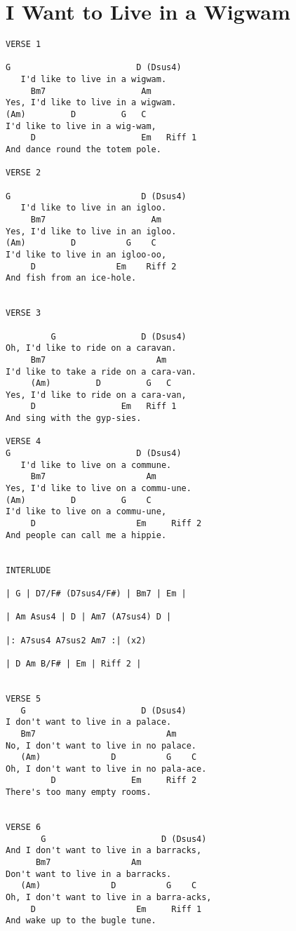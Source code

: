 \documentclass[leqno]{memoir}
\begin{document}
\chapter{I Want to Live in a Wigwam}
\begin{verbatim}
VERSE 1

G                         D (Dsus4)
   I'd like to live in a wigwam. 
     Bm7                   Am
Yes, I'd like to live in a wigwam.
(Am)         D         G   C
I'd like to live in a wig-wam, 
     D                     Em   Riff 1
And dance round the totem pole. 

VERSE 2

G                          D (Dsus4)
   I'd like to live in an igloo. 
     Bm7                     Am
Yes, I'd like to live in an igloo.
(Am)         D          G    C
I'd like to live in an igloo-oo,
     D                Em    Riff 2
And fish from an ice-hole.


VERSE 3

         G                 D (Dsus4)
Oh, I'd like to ride on a caravan.
     Bm7                      Am
I'd like to take a ride on a cara-van.
     (Am)         D         G   C
Yes, I'd like to ride on a cara-van, 
     D                 Em   Riff 1
And sing with the gyp-sies.

VERSE 4
G                         D (Dsus4)
   I'd like to live on a commune.
     Bm7                    Am
Yes, I'd like to live on a commu-une.
(Am)         D         G    C
I'd like to live on a commu-une,
     D                    Em     Riff 2
And people can call me a hippie.


INTERLUDE

| G | D7/F# (D7sus4/F#) | Bm7 | Em | 

| Am Asus4 | D | Am7 (A7sus4) D | 

|: A7sus4 A7sus2 Am7 :| (x2)

| D Am B/F# | Em | Riff 2 |


VERSE 5
   G                       D (Dsus4)
I don't want to live in a palace.
   Bm7                          Am
No, I don't want to live in no palace.
   (Am)              D          G    C
Oh, I don't want to live in no pala-ace.
         D               Em     Riff 2
There's too many empty rooms. 


VERSE 6
       G                       D (Dsus4)
And I don't want to live in a barracks,
      Bm7                Am
Don't want to live in a barracks.
   (Am)              D          G    C
Oh, I don't want to live in a barra-acks,
     D                    Em     Riff 1
And wake up to the bugle tune.



\end{verbatim}
\end{document}
